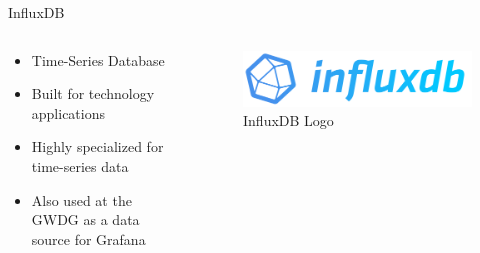 \documentclass[compress,aspectratio=169]{beamer}
\begin{document}
\begin{frame}{InfluxDB}
\begin{columns}[T]
\begin{column}{0.5\textwidth}
\begin{itemize}
  \item Time-Series Database
  \item Built for technology applications
  \item Highly specialized for time-series data
  \item Also used at the GWDG as a data source for Grafana
\end{itemize}
\end{column}
\begin{column}{0.5\textwidth}
\begin{figure}
  \includegraphics[width=\textwidth]{influxdb.png}
  \caption{InfluxDB Logo}
\end{figure}
\end{column}
\end{columns}
\end{frame}
\end{document}
